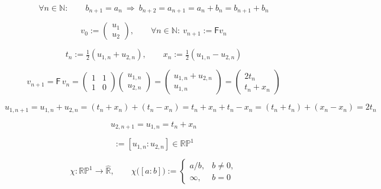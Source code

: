 \documentclass[12pt]{article}
\begin{document}
\begin{equation}
\forall n\in\mathbb{N}:\qquad
b_{n+1}=a_n
\ \Longrightarrow\
b_{n+2}=a_{n+1}=a_n+b_n=b_{n+1}+b_n
\end{equation}

\begin{equation}
v_0:=\begin{pmatrix}u_1\\[2pt]u_2\end{pmatrix},
\qquad
\forall n\in\mathbb{N}:\ v_{n+1}:=\mathsf{F}v_n
\end{equation}

\begin{equation}
t_n:=\tfrac12(u_{1,n}+u_{2,n}),\qquad
x_n:=\tfrac12(u_{1,n}-u_{2,n})
\end{equation}

\begin{equation}
v_{n+1}
=\mathsf{F}\,v_n
=\begin{pmatrix}1&1\\[2pt]1&0\end{pmatrix}
\begin{pmatrix}u_{1,n}\\[2pt]u_{2,n}\end{pmatrix}
=\begin{pmatrix}u_{1,n}+u_{2,n}\\[2pt]u_{1,n}\end{pmatrix}
=\begin{pmatrix}2t_n\\[2pt]t_n+x_n\end{pmatrix}
\end{equation}

\begin{equation}
u_{1,n+1}
=u_{1,n}+u_{2,n}
=(t_n+x_n)+(t_n-x_n)
=t_n+x_n+t_n-x_n
=(t_n+t_n)+(x_n-x_n)
=2t_n
\end{equation}

\begin{equation}
u_{2,n+1}=u_{1,n}=t_n+x_n
\end{equation}

\begin{equation}
[v_n]:=[u_{1,n}:u_{2,n}]\in\mathbb{RP}^1
\end{equation}

\begin{equation}
\chi:\mathbb{RP}^1\to\widehat{\mathbb{R}},\qquad
\chi\bigl([a:b]\bigr):=
\begin{cases}
a/b,& b\neq 0,\\[4pt]
\infty,& b=0
\end{cases}
\end{equation}
\end{document}
